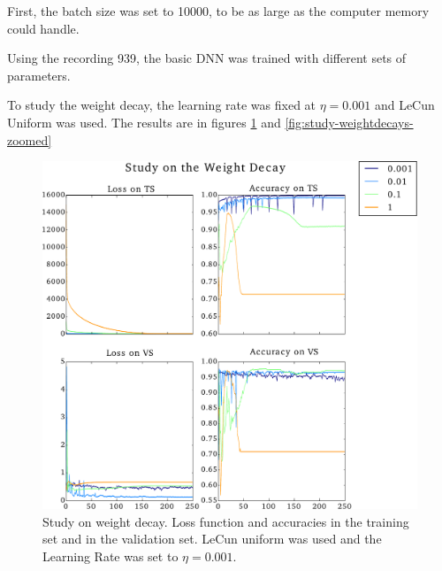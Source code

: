 \documentclass{article}
\begin{document}
First, the batch size was set to 10000, to be as large as the computer memory could handle.

Using the recording 939, the basic DNN was trained with different sets of parameters. 

To study the weight decay, the learning rate was fixed at $\eta = 0.001$ and LeCun Uniform was used. The results are in figures \ref{fig:study-weightdecays} and \ref{fig:study-weightdecays-zoomed}

\begin{figure}[H]
	\centering
	\includegraphics[width=\linewidth]{study_on_weight_decays_v2.pdf}
	\caption{Study on weight decay. Loss function and accuracies in the training set and in the validation set. LeCun uniform was used and the Learning Rate was set to $\eta = 0.001$.
}
\label{fig:study-weightdecays}
\end{figure}
\end{document}

